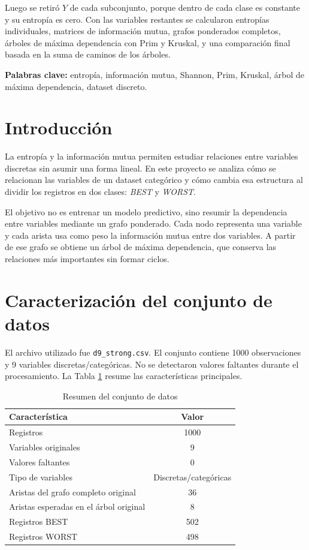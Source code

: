 \documentclass[12pt,a4paper]{article}
\begin{document}
Luego se retiró \(Y\) de cada subconjunto, porque dentro de cada clase es constante y su entropía es cero. Con las variables restantes se calcularon entropías individuales, matrices de información mutua, grafos ponderados completos, árboles de máxima dependencia con Prim y Kruskal, y una comparación final basada en la suma de caminos de los árboles.

\textbf{Palabras clave:} entropía, información mutua, Shannon, Prim, Kruskal, árbol de máxima dependencia, dataset discreto.

\section{Introducción}

La entropía y la información mutua permiten estudiar relaciones entre variables discretas sin asumir una forma lineal. En este proyecto se analiza cómo se relacionan las variables de un dataset categórico y cómo cambia esa estructura al dividir los registros en dos clases: \textit{BEST} y \textit{WORST}.

El objetivo no es entrenar un modelo predictivo, sino resumir la dependencia entre variables mediante un grafo ponderado. Cada nodo representa una variable y cada arista usa como peso la información mutua entre dos variables. A partir de ese grafo se obtiene un árbol de máxima dependencia, que conserva las relaciones más importantes sin formar ciclos.

\section{Caracterización del conjunto de datos}

El archivo utilizado fue \texttt{d9\_strong.csv}. El conjunto contiene 1000 observaciones y 9 variables discretas/categóricas. No se detectaron valores faltantes durante el procesamiento. La Tabla \ref{tab:resumen_dataset} resume las características principales.

\begin{table}[H]
\centering
\caption{Resumen del conjunto de datos}
\label{tab:resumen_dataset}
\begin{tabular}{lc}
\toprule
\textbf{Característica} & \textbf{Valor} \\
\midrule
Registros & 1000 \\
Variables originales & 9 \\
Valores faltantes & 0 \\
Tipo de variables & Discretas/categóricas \\
Aristas del grafo completo original & 36 \\
Aristas esperadas en el árbol original & 8 \\
Registros BEST & 502 \\
Registros WORST & 498 \\
\bottomrule
\end{tabular}
\end{table}
\end{document}
